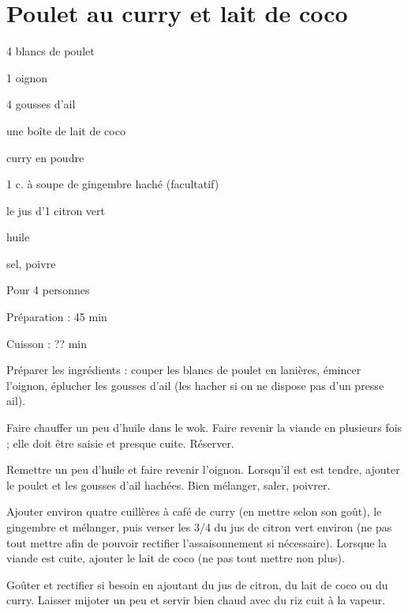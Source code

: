 \section[\normalsize{Poulet au curry et lait de coco}]{Poulet au curry et lait de coco}

\begin{ingredients}
\item 4 blancs de poulet 
\item 1 oignon 
\item 4 gousses d'ail
\item une bo\^ite de lait de coco
\item curry en poudre
\item 1 c. \`a soupe de gingembre hach\'e (facultatif)
\item le jus d'1 citron vert
\item huile
\item sel, poivre
\end{ingredients}
\begin{infos}
\item Pour 4 personnes
\item Préparation : 45 min
\item Cuisson : ?? min
\end{infos}
\begin{etapes}
\item Pr\'eparer les ingr\'edients : couper les blancs de poulet en lani\`eres, \'emincer l'oignon, \'eplucher les gousses d'ail (les hacher si on ne dispose pas d'un presse ail).
\item Faire chauffer un peu d'huile dans le wok. Faire revenir la viande en plusieurs fois ; elle doit \^etre saisie et presque cuite. R\'eserver. 
\item Remettre un peu d'huile et faire revenir l'oignon. Lorsqu'il est est tendre, ajouter le poulet et les gousses d'ail hach\'ees. Bien m\'elanger, saler, poivrer.
\item Ajouter environ quatre cuill\`eres \`a caf\'e de curry (en mettre selon son goût), le gingembre et m\'elanger, puis verser les 3/4 du jus de citron vert environ (ne pas tout mettre afin de pouvoir rectifier l'assaisonnement si n\'ecessaire). Lorsque la viande est cuite, ajouter le lait de coco (ne pas tout mettre non 
plus).
\item Goûter et rectifier si besoin en ajoutant du jus de citron, du lait de coco ou du curry. Laisser mijoter un peu et servir bien chaud avec du riz cuit \`a la vapeur.
\end{etapes}
\begin{conseils}
\end{conseils}

